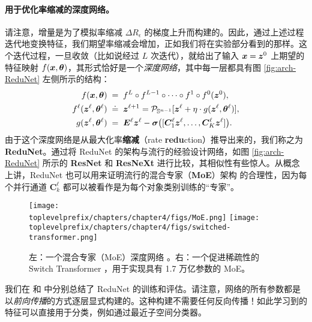 \documentclass[../../book-main.tex]{subfiles}
\begin{document}
\paragraph{用于优化率缩减的深度网络。} 请注意，增量是为了模拟率缩减 $\Delta R_\epsilon$ 的梯度上升而构建的。因此，通过上述过程迭代地变换特征，我们期望率缩减会增加，正如我们将在实验部分看到的那样。这个迭代过程，一旦收敛（比如说经过 $L$ 次迭代），就给出了输入 $\bm{x} = \bm{z}^0$ 上期望的特征映射 $f(\bm{x}, \bm \theta)$，其形式恰好是一个{\em 深度网络}，其中每一层都具有图 \ref{fig:arch-ReduNet} 左侧所示的结构：
\begin{equation}\label{eqn:ReduNet}
\begin{aligned}
f(\bm{x}, \bm \theta)\; =&  \;\;f^L \circ f^{L-1} \circ  \cdots \circ f^1 \circ
    f^0(\bm{z}^0),  \\
f^\ell(\bm{z}^\ell, \bm \theta^\ell) \; \doteq & \;\; \bm{z}^{\ell+1} = \mathcal{P}_{\mathbb{S}^{n-1}}[\bm{z}^{\ell} + \eta\cdot g(\bm{z}^{\ell}, \bm \theta^{\ell})], \\
g(\bm{z}^{\ell}, \bm \theta^{\ell}) \; =&\;\; \bm E^{\ell} \bm{z}^{\ell} -  \bm \sigma\big([\bm{C}^{\ell}_{1} \bm{z}^{\ell}, \dots, \bm{C}^{\ell}_{K} \bm{z}^{\ell}]\big).
\end{aligned}
\end{equation}
由于这个深度网络是从最大化率\textbf{缩减}（rate \textbf{redu}ction）推导出来的，我们称之为 \textbf{ReduNet}。通过将 ReduNet 的架构与流行的经验设计网络，如图 \ref{fig:arch-ReduNet} 所示的 \textbf{ResNet} 和 \textbf{ResNeXt} 进行比较，其相似性有些惊人。从概念上讲，ReduNet 也可以用来证明流行的混合专家（\textbf{MoE}）架构 \cite{MoE} 的合理性，因为每个并行通道 $\bm{C}^{\ell}_k$ 都可以被看作是为每个对象类别训练的“专家”。

\begin{figure}[t]
    \centering
    \texttt{[image: \\toplevelprefix/chapters/chapter4/figs/MoE.png]} \hspace{5mm}
    \texttt{[image: \\toplevelprefix/chapters/chapter4/figs/switched-transformer.png]}
    \caption{左：一个混合专家（MoE）深度网络 \cite{MoE}。右：一个促进稀疏性的 Switch Transformer \cite{Fedus-2022}，用于实现具有 1.7 万亿参数的 MoE。}
    \label{fig:enter-label}
\end{figure}

我们在  和  中分别总结了 ReduNet 的训练和评估。请注意，网络的所有参数都是以{\em 前向传播}的方式逐层显式构建的。这种构建不需要任何反向传播！如此学习到的特征可以直接用于分类，例如通过最近子空间分类器。
\end{document}
